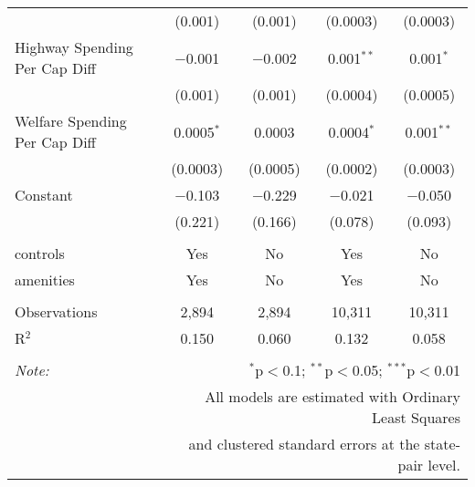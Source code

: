 \begin{table}[!htbp]
\begin{tabular}{@{\extracolsep{5pt}}lcccc}
  & (0.001) & (0.001) & (0.0003) & (0.0003) \\ 
  Highway Spending Per Cap Diff & $-$0.001 & $-$0.002 & 0.001$^{**}$ & 0.001$^{*}$ \\ 
  & (0.001) & (0.001) & (0.0004) & (0.0005) \\ 
  Welfare Spending Per Cap Diff & 0.0005$^{*}$ & 0.0003 & 0.0004$^{*}$ & 0.001$^{**}$ \\ 
  & (0.0003) & (0.0005) & (0.0002) & (0.0003) \\ 
  Constant & $-$0.103 & $-$0.229 & $-$0.021 & $-$0.050 \\ 
  & (0.221) & (0.166) & (0.078) & (0.093) \\ 
 \hline \\[-1.8ex] 
controls & Yes & No & Yes & No \\ 
amenities & Yes & No & Yes & No \\ 
\hline \\[-1.8ex] 
Observations & 2,894 & 2,894 & 10,311 & 10,311 \\ 
R$^{2}$ & 0.150 & 0.060 & 0.132 & 0.058 \\ 
\hline 
\hline \\[-1.8ex] 
\textit{Note:}  & \multicolumn{4}{r}{$^{*}$p$<$0.1; $^{**}$p$<$0.05; $^{***}$p$<$0.01} \\ 
 & \multicolumn{4}{r}{All models are estimated with Ordinary Least Squares} \\ 
 & \multicolumn{4}{r}{and clustered standard errors at the state-pair level.} \\ 
\end{tabular} 
\end{table} 
